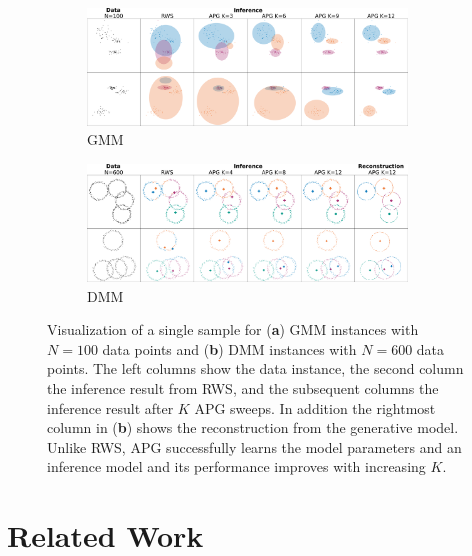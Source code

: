 \documentclass{article}
\theoremstyle{definition}
\begin{document}
\begin{figure}[t!]
  \centering
  \begin{subfigure}[t]{0.5\textwidth}
  \includegraphics[width=85mm]{figures/gmm_samples_2datasets.pdf}
  \vspace*{-1mm}
  \caption{GMM}
  \label{fig:samples-gmm}
  \vspace{-1ex}
  \end{subfigure}%
  \begin{subfigure}[t]{0.5\textwidth}
  \includegraphics[width=85mm]{figures/dgmm_samples_2datasets.pdf}
  \vspace*{-1mm}
  \caption{DMM}
  \label{fig:samples-dgmm}
  \vspace{-1ex}
  \end{subfigure}
  \caption{Visualization of a single sample for (\textbf{a}) GMM instances with $N=100$ data points and (\textbf{b}) DMM instances with $N=600$ data points. The left columns show the data instance, the second column the inference result from RWS, and the subsequent columns the inference result after $K$ APG sweeps. In addition the rightmost column in (\textbf{b}) shows the reconstruction from the generative model.
  Unlike RWS, APG successfully learns the model parameters and an inference model and its performance improves with increasing $K$.}
  \vspace{-0.25em}
  \label{fig:samples-mixture}
\end{figure}

\vspace{-0.75em}
\section{Related Work}
\vspace{-0.5em}
\end{document}
